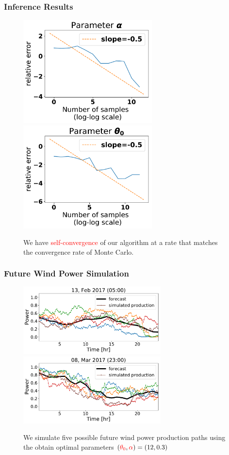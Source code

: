 \documentclass[aspectratio=169]{beamer}\usepackage[utf8]{inputenc}
\begin{document}
\begin{frame}\frametitle{Inference Results}
\begin{figure}
  \includegraphics[width=70mm,scale=1]{plots/alpha_conv_beta.pdf}
  \includegraphics[width=70mm,scale=1]{plots/theta_conv_beta.pdf}
  \caption{We have \textcolor{red}{self-convergence} of our algorithm at a rate that matches the convergence rate of Monte Carlo.}
\end{figure}
\end{frame}

\begin{frame}\frametitle{Future Wind Power Simulation}
    \begin{figure}
      \includegraphics[width=75mm,scale=1]{simulated/24hr/1099.pdf}
      \includegraphics[width=75mm,scale=1]{simulated/24hr/1178.pdf}
      \caption{We simulate five possible future wind power production paths using the obtain optimal parameters $(\textcolor{red}{\theta_0}, \textcolor{red}{\alpha} )=(12,0.3)$ }
    \end{figure}
\end{frame}
\end{document}
